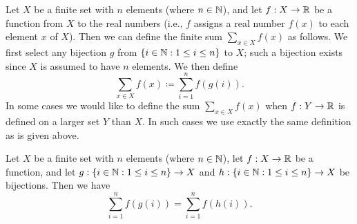 \begin{defn}\label{i:7.1.6}
  Let \(X\) be a finite set with \(n\) elements (where \(n \in \mathbb{N}\)), and let \(f : X \to \mathbb{R}\) be a function from \(X\) to the real numbers
  (i.e., \(f\) assigns a real number \(f(x)\) to each element \(x\) of \(X\)).
  Then we can define the finite sum \(\sum_{x \in X} f(x)\) as follows.
  We first select any bijection \(g\) from \(\left\lbrace i \in \mathbb{N} : 1 \leq i \leq n\right\rbrace\) to \(X\);
  such a bijection exists since \(X\) is assumed to have \(n\) elements.
  We then define
  \[
    \sum_{x \in X} f(x) \coloneqq \sum_{i = 1}^n f(g(i)).
  \]
  In some cases we would like to define the sum \(\sum_{x \in X} f(x)\) when \(f : Y \to \mathbb{R}\) is defined on a larger set \(Y\) than \(X\).
  In such cases we use exactly the same definition as is given above.
\end{defn}

\setcounter{thm}{7}
\begin{prop}\label{i:7.1.8}
  Let \(X\) be a finite set with \(n\) elements (where \(n \in \mathbb{N}\)), let \(f : X \to \mathbb{R}\) be a function, and let \(g : \left\lbrace i \in \mathbb{N} : 1 \leq i \leq n\right\rbrace \to X\) and \(h : \left\lbrace i \in \mathbb{N} : 1 \leq i \leq n\right\rbrace \to X\) be bijections.
  Then we have
  \[
    \sum_{i = 1}^n f(g(i)) = \sum_{i = 1}^n f(h(i)).
  \]
\end{prop}

